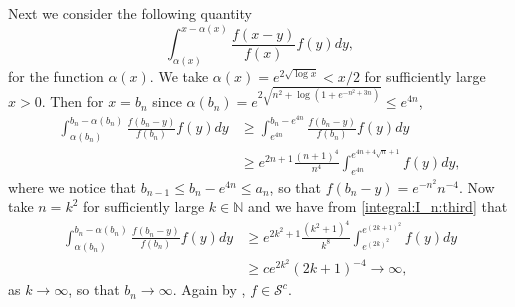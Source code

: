 \documentclass[12pt,leqno]{amsart}
\newcommand{\N}{\mathbb{N}}
\newcommand{\cals}{{\mathcal S}}
\newcommand{\1}{{\mathbf 1}}
\begin{document}
Next we consider the following quantity 
\[
 \int_{\alpha(x)}^{x-\alpha(x)} \frac{f(x-y)}{f(x)}f(y)dy,
\] 
for the function $\alpha(x)$. 
We take $\alpha(x)=e^{2 \sqrt{\log x}}<x/2$ for sufficiently large $x>0$. 
Then for $x=b_n$ since $\alpha(b_n) = e^{2\sqrt{n^2+\log(1+e^{-n^2+3n})}}\le e^{4n}$, 
\begin{align*}
 \int_{\alpha(b_n)}^{b_n-\alpha(b_n)} \frac{f(b_n-y)}{f(b_n)}f(y)dy 
&\ge \int^{b_n-e^{4n}}_{e^{4n}} \frac{f(b_n-y)}{f(b_n)}f(y)dy \\
& \ge e^{2n+1}\frac{(n+1)^4}{n^4} \int_{e^{4n}}^{e^{4n+4\sqrt{n}+1}} f(y)dy, 
\end{align*}
where we notice that $b_{n-1} \le b_n -e^{4n}\le a_n$, so that $f(b_n-y)=e^{-n^2}n^{-4}$. 
Now take $n=k^2$ for sufficiently large $k \in \N$ and we have from \eqref{integral:I_n:third} that 
\begin{align*}
  \int_{\alpha(b_n)}^{b_n-\alpha(b_n)} \frac{f(b_n-y)}{f(b_n)}f(y)dy  
&\ge e^{2k^2+1}\frac{(k^2+1)^4}{k^8} \int_{e^{(2k)^2}}^{e^{(2k+1)^2}} f(y)dy \\
& \ge c e^{2k^2} (2k+1)^{-4} \to \infty,
\end{align*}
as $k\to\infty$, so that $b_n\to \infty$. 
Again by \cite[Theorem 4.7]{Foss:Korshunov:Zachary:2013}, $f\in \cals^c$. \\
\end{document}
